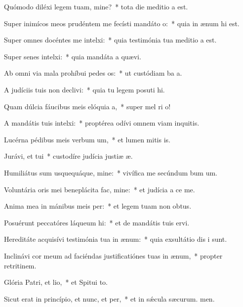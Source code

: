 \item Quómodo diléxi legem tuam, mine?~* tota die meditio a est.
\item Super inimícos meos prudéntem me fecísti mandáto o:~* quia in ænum hi est.
\item Super omnes docéntes me intelxi:~* quia testimónia tua meditio a est.
\item Super senes intelxi:~* quia mandáta a quævi.
\item Ab omni via mala prohíbui pedes os:~* ut custódiam ba a.
\item A judíciis tuis non declivi:~* quia tu legem posuti hi.
\item Quam dúlcia fáucibus meis elóquia a,~* super mel ri o!
\item A mandátis tuis intelxi:~* proptérea odívi omnem viam inquitis.
\item Lucérna pédibus meis verbum um,~* et lumen mitis is.
\item Jurávi, et tui~* custodíre judícia justiæ æ.
\item Humiliátus sum usquequáque, mine:~* vivífica me secúndum bum um.
\item Voluntária oris mei beneplácita fac, mine:~* et judícia a ce me.
\item Anima mea in mánibus meis per:~* et legem tuam non  obtus.
\item Posuérunt peccatóres láqueum hi:~* et de mandátis tuis  ervi.
\item Hereditáte acquisívi testimónia tua in ænum:~* quia exsultátio dis i sunt.
\item Inclinávi cor meum ad faciéndas justificatiónes tuas in ænum,~* propter retritinem.
\item Glória Patri, et lio,~* et Spitui to.
\item Sicut erat in princípio, et nunc, et per,~* et in sǽcula sæcurum. men.
